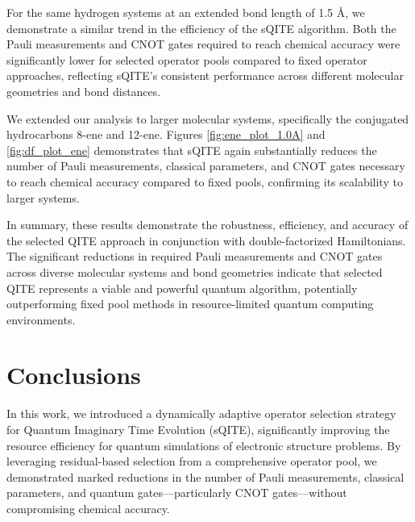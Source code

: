 \documentclass[aip,jcp,amsmath,amssymb, reprint]{revtex4-1}
\begin{document}
For the same hydrogen systems at an extended bond length of 1.5 Å, we demonstrate a similar trend in the efficiency of the sQITE algorithm. Both the Pauli measurements and CNOT gates required to reach chemical accuracy were significantly lower for selected operator pools compared to fixed operator approaches, reflecting sQITE's consistent performance across different molecular geometries and bond distances.

We extended our analysis to larger molecular systems, specifically the conjugated hydrocarbons 8-ene and 12-ene. Figures \ref{fig:ene_plot_1.0A} and \ref{fig:df_plot_ene} demonstrates that sQITE again substantially reduces the number of Pauli measurements, classical parameters, and CNOT gates necessary to reach chemical accuracy compared to fixed pools, confirming its scalability to larger systems.


In summary, these results demonstrate the robustness, efficiency, and accuracy of the selected QITE approach in conjunction with double-factorized Hamiltonians. The significant reductions in required Pauli measurements and CNOT gates across diverse molecular systems and bond geometries indicate that selected QITE represents a viable and powerful quantum algorithm, potentially outperforming fixed pool methods in resource-limited quantum computing environments.
\section{Conclusions}
In this work, we introduced a dynamically adaptive operator selection strategy for Quantum Imaginary Time Evolution (sQITE), significantly improving the resource efficiency for quantum simulations of electronic structure problems. By leveraging residual-based selection from a comprehensive operator pool, we demonstrated marked reductions in the number of Pauli measurements, classical parameters, and quantum gates—particularly CNOT gates—without compromising chemical accuracy.
\end{document}
